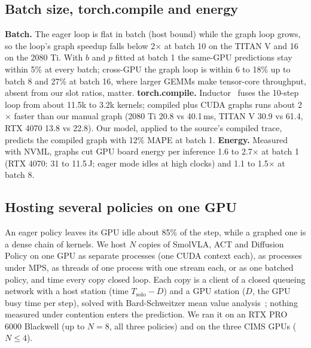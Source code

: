 \documentclass[10pt,twocolumn]{article}
\begin{document}
\subsection{Batch size, torch.compile and energy}
\textbf{Batch.} The eager loop is flat in batch (host bound) while the graph loop grows, so the
loop's graph speedup falls below 2$\times$ at batch 10 on the TITAN V and 16 on the 2080 Ti.
With $b$ and $p$ fitted at batch 1 the same-GPU predictions stay within 5\% at every batch;
cross-GPU the graph loop is within 6 to 18\% up to batch 8 and 27\% at batch 16, where larger
GEMMs make tensor-core throughput, absent from our slot ratios, matter.
\textbf{torch.compile.} Inductor~\cite{pytorch2} fuses the 10-step loop from about 11.5k to 3.2k kernels;
compiled plus CUDA graphs runs about 2$\times$ faster than our manual graph (2080 Ti 20.8 vs
40.1\,ms, TITAN V 30.9 vs 61.4, RTX 4070 13.8 vs 22.8). Our model, applied to the source's
compiled trace, predicts the compiled graph with 12\% MAPE at batch 1.
\textbf{Energy.} Measured with NVML, graphs cut GPU board energy per inference 1.6 to
2.7$\times$ at batch 1 (RTX 4070: 31 to 11.5\,J; eager mode idles at high clocks) and 1.1 to
1.5$\times$ at batch 8.





\subsection{Hosting several policies on one GPU}\label{sec:multipolicy}
An eager policy leaves its GPU idle about 85\% of the step, while a graphed one is a dense
chain of kernels. We host $N$ copies of SmolVLA, ACT and Diffusion Policy on one GPU as
separate processes (one CUDA context each), as processes under MPS, as threads of one process
with one stream each, or as one batched policy, and time every copy closed loop. Each copy is a
client of a closed queueing network with a host station (time $T_\mathrm{solo} - D$) and a GPU
station ($D$, the GPU busy time per step), solved with Bard-Schweitzer mean value
analysis~\cite{mva,schweitzer}; nothing measured under contention enters the prediction. We ran
it on an RTX PRO 6000 Blackwell (up to $N = 8$, all three policies) and on the three CIMS GPUs
($N \le 4$).
\end{document}
